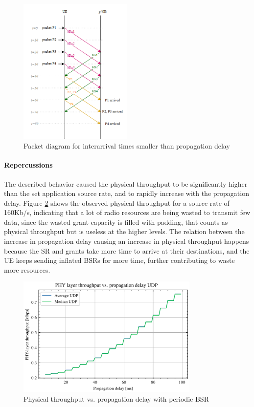 \begin{figure}[ht]
    \centering
    \includegraphics[width=0.5\textwidth]{res/diagram-inflated-bsr.png}
    \caption{Packet diagram for interarrival times smaller than propagation delay}
    \label{fig:inflated-bsr-diag}
\end{figure}

\paragraph{Repercussions}
The described behavior caused the physical throughput to be significantly higher than the set application source rate, and to rapidly increase with the propagation delay. Figure \ref{fig:phy-thr-runaway} shows the observed physical throughput for a source rate of 160Kb/s, indicating that a lot of radio resources are being wasted to transmit few data, since the wasted grant capacity is filled with padding, that counts as physical throughput but is useless at the higher levels. The relation between the increase in propagation delay causing an increase in physical throughput happens because the \ac{SR} and grants take more time to arrive at their destinations, and the \ac{UE} keeps sending inflated \ac{BSR}s for more time, further contributing to waste more resources.

\begin{figure}[ht]
    \centering
    \includegraphics[width=0.8\textwidth]{res/phy-thr-udp-runaway.png}
    \caption{Physical throughput vs. propagation delay with periodic \ac{BSR}}
    \label{fig:phy-thr-runaway}
\end{figure}

